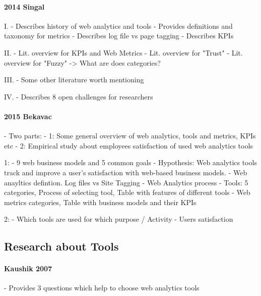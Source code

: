 \paragraph{2014 Singal}

I.
- Describes history of web analytics and tools
- Provides definitions and taxonomy for metrics
- Describes log file vs page tagging
- Describes KPIs

II.
- Lit. overview for KPIs and Web Metrics
- Lit. overview for "Trust"
- Lit. overview for "Fuzzy"
-> What are does categories?


III.
- Some other literature worth mentioning


IV.
- Describes 8 open challenges for researchers




\paragraph{2015 Bekavac}

- Two parts:
	- 1: Some general overview of web analytics, tools and metrics, KPIs etc
	- 2: Empirical study about employees satisfaction of used web analytics tools

1: 
- 9 web business models and 5 common goals
- Hypothesis: Web analytics tools track and improve a user’s satisfaction with web-based business models.
- Web anayltics defintion. Log files vs Site Tagging
- Web Analytics process
- Tools: 5 categories, Process of selecting tool, Table with features of different tools
- Web metrics categories, Table with business models and their KPIs

2:
- Which tools are used for which purpose / Activity
- Users satisfaction





\subsection{Research about Tools}



\paragraph{Kaushik 2007}
- Provides 3 questions which help to choose web analytics tools


